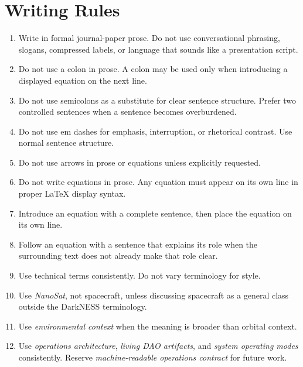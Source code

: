 \documentclass[11pt]{article}
\begin{document}
\section*{Writing Rules}

\begin{enumerate}

\item Write in formal journal-paper prose. Do not use conversational phrasing, slogans, compressed labels, or language that sounds like a presentation script.

\item Do not use a colon in prose. A colon may be used only when introducing a displayed equation on the next line.

\item Do not use semicolons as a substitute for clear sentence structure. Prefer two controlled sentences when a sentence becomes overburdened.

\item Do not use em dashes for emphasis, interruption, or rhetorical contrast. Use normal sentence structure.

\item Do not use arrows in prose or equations unless explicitly requested.

\item Do not write equations in prose. Any equation must appear on its own line in proper \LaTeX{} display syntax.

\item Introduce an equation with a complete sentence, then place the equation on its own line.

\item Follow an equation with a sentence that explains its role when the surrounding text does not already make that role clear.

\item Use technical terms consistently. Do not vary terminology for style.

\item Use \emph{NanoSat}, not spacecraft, unless discussing spacecraft as a general class outside the DarkNESS terminology.

\item Use \emph{environmental context} when the meaning is broader than orbital context.

\item Use \emph{operations architecture}, \emph{living DAO artifacts}, and \emph{system operating modes} consistently. Reserve \emph{machine-readable operations contract} for future work.


\end{enumerate}
\end{document}
